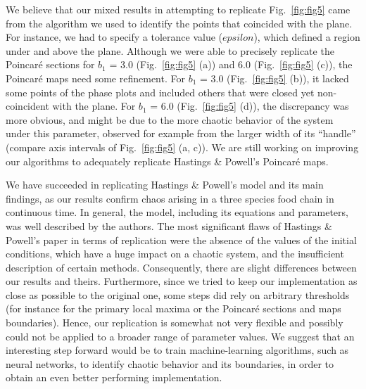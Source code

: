\documentclass[
]{article}
\begin{document}
We believe that our mixed results in attempting to replicate
Fig.~\ref{fig:fig5} came from the algorithm we used to identify the
points that coincided with the plane. For instance, we had to specify a
tolerance value (\(epsilon\)), which defined a region under and above
the plane. Although we were able to precisely replicate the Poincaré
sections for \(b_1\) = 3.0 (Fig.~\ref{fig:fig5} (a)) and 6.0
(Fig.~\ref{fig:fig5} (c)), the Poincaré maps need some refinement. For
\(b_1\) = 3.0 (Fig.~\ref{fig:fig5} (b)), it lacked some points of the
phase plots and included others that were closed yet non-coincident with
the plane. For \(b_1\) = 6.0 (Fig.~\ref{fig:fig5} (d)), the discrepancy
was more obvious, and might be due to the more chaotic behavior of the
system under this parameter, observed for example from the larger width
of its ``handle'' (compare axis intervals of Fig.~\ref{fig:fig5} (a,
c)). We are still working on improving our algorithms to adequately
replicate Hastings \& Powell's Poincaré maps.

We have succeeded in replicating Hastings \& Powell's model and its main
findings, as our results confirm chaos arising in a three species food
chain in continuous time. In general, the model, including its equations
and parameters, was well described by the authors. The most significant
flaws of Hastings \& Powell's paper in terms of replication were the
absence of the values of the initial conditions, which have a huge
impact on a chaotic system, and the insufficient description of certain
methods. Consequently, there are slight differences between our results
and theirs. Furthermore, since we tried to keep our implementation as
close as possible to the original one, some steps did rely on arbitrary
thresholds (for instance for the primary local maxima or the Poincaré
sections and maps boundaries). Hence, our replication is somewhat not
very flexible and possibly could not be applied to a broader range of
parameter values. We suggest that an interesting step forward would be
to train machine-learning algorithms, such as neural networks, to
identify chaotic behavior and its boundaries, in order to obtain an even
better performing implementation.
\end{document}
